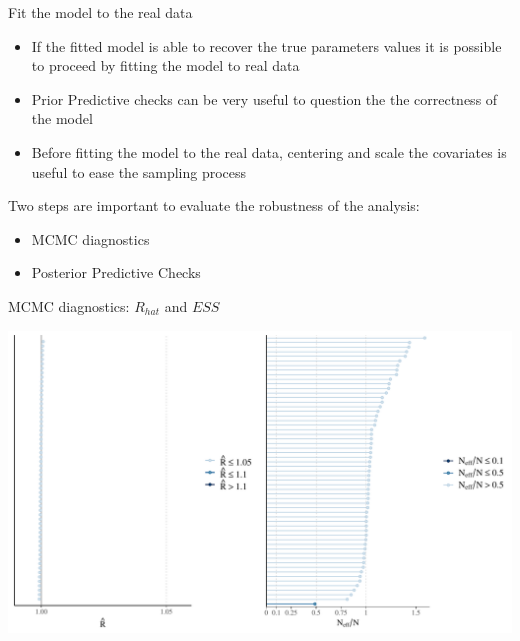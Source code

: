\documentclass[ignorenonframetext,a4paper]{beamer}
\begin{document}
\begin{frame}{Fit the model to the real data}

\begin{itemize}
\setlength\itemsep{1em}
  \item{If the fitted model is able to recover the true parameters
        values it is possible to proceed by fitting the model to
        real data}
  \item{Prior Predictive checks can be very useful to question the
        the correctness of the model}
  \item{Before fitting the model to the real data, centering and scale
        the covariates is useful to ease the sampling process}
\end{itemize}

Two steps are important to evaluate the robustness of the analysis:

\begin{itemize}
  \item{MCMC diagnostics}
  \item{Posterior Predictive Checks}
\end{itemize}

\end{frame}

\begin{frame}{MCMC diagnostics: \(R_{hat}\) and \(ESS\)}

\includegraphics{DB_presentation_case_study_files/figure-beamer/unnamed-chunk-10-1.pdf}

\end{frame}
\end{document}
